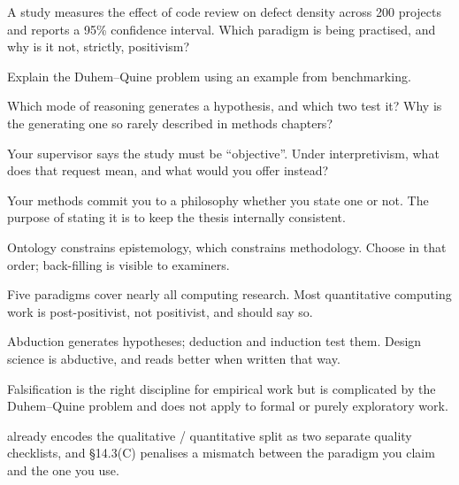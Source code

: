 \begin{checkpoint}
\begin{tightnum}
  \item A study measures the effect of code review on defect density across 200
    projects and reports a 95\% confidence interval. Which paradigm is being
    practised, and why is it not, strictly, positivism?
  \item Explain the Duhem--Quine problem using an example from benchmarking.
  \item Which mode of reasoning generates a hypothesis, and which two test it?
    Why is the generating one so rarely described in methods chapters?
  \item Your supervisor says the study must be ``objective''. Under
    interpretivism, what does that request mean, and what would you offer
    instead?
\end{tightnum}
\end{checkpoint}

\begin{chaptersummary}
\begin{tight}
  \item Your methods commit you to a philosophy whether you state one or not.
    The purpose of stating it is to keep the thesis internally consistent.
  \item Ontology constrains epistemology, which constrains methodology. Choose
    in that order; back-filling is visible to examiners.
  \item Five paradigms cover nearly all computing research. Most quantitative
    computing work is post-positivist, not positivist, and should say so.
  \item Abduction generates hypotheses; deduction and induction test them.
    Design science is abductive, and reads better when written that way.
  \item Falsification is the right discipline for empirical work but is
    complicated by the Duhem--Quine problem and does not apply to formal or
    purely exploratory work.
  \item {} already encodes the qualitative /
    quantitative split as two separate quality checklists, and \S14.3(C)
    penalises a mismatch between the paradigm you claim and the one you use.
\end{tight}
\end{chaptersummary}

